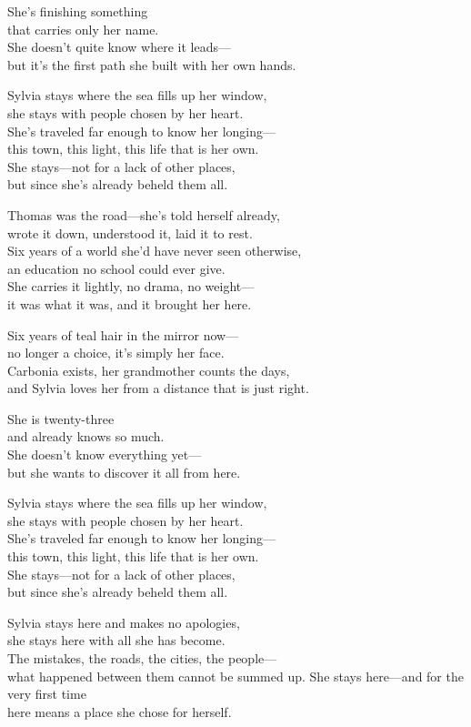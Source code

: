 \begin{lyrics}
She’s finishing something\\
that carries only her name.\\
She doesn’t quite know where it leads—\\
but it’s the first path she built with her own hands.

Sylvia stays where the sea fills up her window,\\
she stays with people chosen by her heart.\\
She’s traveled far enough to know her longing—\\
this town, this light, this life that is her own.\\
She stays—not for a lack of other places,\\
but since she’s already beheld them all.

Thomas was the road—she’s told herself already,\\
wrote it down, understood it, laid it to rest.\\
Six years of a world she’d have never seen otherwise,\\
an education no school could ever give.\\
She carries it lightly, no drama, no weight—\\
it was what it was, and it brought her here.

Six years of teal hair in the mirror now—\\
no longer a choice, it’s simply her face.\\
Carbonia exists, her grandmother counts the days,\\
and Sylvia loves her from a distance that is just right.

She is twenty-three\\
and already knows so much.\\
She doesn’t know everything yet—\\
but she wants to discover it all from here.

Sylvia stays where the sea fills up her window,\\
she stays with people chosen by her heart.\\
She’s traveled far enough to know her longing—\\
this town, this light, this life that is her own.\\
She stays—not for a lack of other places,\\
but since she’s already beheld them all.

Sylvia stays here and makes no apologies,\\
she stays here with all she has become.\\
The mistakes, the roads, the cities, the people—\\
what happened between them cannot be summed up.
She stays here—and for the very first time\\
here means a place she chose for herself.

\end{lyrics}

